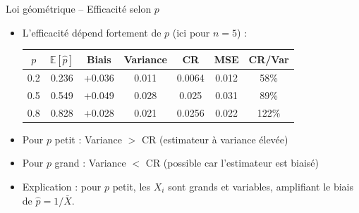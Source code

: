 \documentclass[11pt,aspectratio=169]{beamer}
\begin{document}
\begin{frame}{Loi géométrique -- Efficacité selon $p$}

\begin{itemize}

\item L'efficacité dépend fortement de $p$ (ici pour $n = 5$) :

  \medskip

  \begin{center}
    \small
    \begin{tabular}{ccccccc}
      \hline
      $p$ & $\mathbb{E}[\hat{p}]$ & Biais & Variance & CR & MSE & CR/Var \\
      \hline
      0.2 & 0.236 & +0.036 & 0.011 & 0.0064 & 0.012 & 58\% \\
      0.5 & 0.549 & +0.049 & 0.028 & 0.025 & 0.031 & 89\% \\
      0.8 & 0.828 & +0.028 & 0.021 & 0.0256 & 0.022 & 122\% \\
      \hline
    \end{tabular}
  \end{center}
  
  \medskip

\item Pour $p$ petit : Variance $>$ CR (estimateur à variance élevée)\newline

\item Pour $p$ grand : Variance $<$ CR (possible car l'estimateur est biaisé)\newline

\item Explication : pour $p$ petit, les $X_i$ sont grands et variables, amplifiant le biais de $\hat{p} = 1/\bar{X}$.

\end{itemize}

\end{frame}
\end{document}
